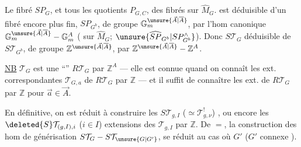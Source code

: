 Le fibré $SP_G$, et tous les quotients $P_{G,C}$,  des fibrés sur $\widehat M_G$.  est déduisible d'un fibré encore plus fin, $SP_{G^b}$, de groupe $\mathbb{G}_m^{\unsure{\vec A|\overline A}}$, par l'hom canonique $\mathbb{G}_m^{\unsure{\vec A|\overline A}}-\mathbb{G}_m^A$ ( sur $\widehat M_G$;  $\unsure{\widehat{SP}_{G^b}|SP^{\wedge}_{G^b}}$). Donc $S\mathcal{T}_G$ déduisible de $S\mathcal{T}_{G^b}$, de groupe $\mathbb{Z}^{\unsure{\vec A|\overline A}}$, par $\mathbb{Z}^{\unsure{\vec A|\overline A}}-\mathbb{Z}^A$.

\uline{NB} $\mathcal{T}_G$ est une ``\uline{}''  $R\mathcal{T}_G$ par $\mathbb{Z}^A$ --- elle est connue quand on connaît les ext. correspondantes $\mathcal{T}_{G,a}$ de $R\mathcal{T}_G$  par $\mathbb{Z}$ --- et il suffit de connaître les ext.   de $R\mathcal{T}_G$ par $\mathbb{Z}$ pour $\vec a\in\vec A$.


En définitive, on est réduit à construire les $S\mathcal{T}_{g,I}$ ($\simeq\mathcal{T}_{g,\nu}^{!}$) , ou encore les $\deleted{S}\mathcal{T}_{(g,I),i}$ ($i\in I$) extensions des $\mathcal{T}_{g,I}$ par $\mathbb{Z}$. De $=$, la construction des hom de générisation $S\mathcal{T}_G-S\mathcal{T}_{\unsure{G|G'}}$, se réduit au cas où $G'$   ($G'$ connexe  ).

